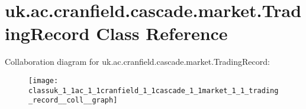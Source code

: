 \hypertarget{classuk_1_1ac_1_1cranfield_1_1cascade_1_1market_1_1_trading_record}{\section{uk.\-ac.\-cranfield.\-cascade.\-market.\-Trading\-Record Class Reference}
\label{classuk_1_1ac_1_1cranfield_1_1cascade_1_1market_1_1_trading_record}
}


Collaboration diagram for uk.\-ac.\-cranfield.\-cascade.\-market.\-Trading\-Record\-:\nopagebreak
\begin{figure}[H]
\begin{center}
\leavevmode
\texttt{[image: classuk\_1\_1ac\_1\_1cranfield\_1\_1cascade\_1\_1market\_1\_1\_trading\_record\_\_coll\_\_graph]}
\end{center}
\end{figure}
